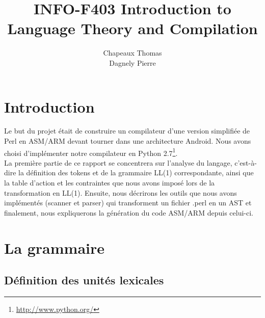 \documentclass[a4paper,10pt]{article}
\title{INFO-F403 Introduction to Language Theory and Compilation}
\author{Chapeaux Thomas\\Dagnely Pierre}
\begin{document}
\maketitle


\pagebreak


\renewcommand{\contentsname}{Table des matières}
\tableofcontents

\section{Introduction}

Le but du projet était de construire un compilateur d'une version simplifiée de Perl en ASM/ARM devant tourner dans une architecture Android. Nous avons choisi d'implémenter notre compilateur en Python 2.7\footnote{\url{http://www.python.org/}}.\\

La première partie de ce rapport se concentrera sur l'analyse du langage, c'est-à-dire la définition des tokens et de la grammaire LL(1) correspondante, ainsi que la table d'action et les contraintes que nous avons imposé lors de la transformation en LL(1). Ensuite, nous décrirons les outils que nous avons implémentés (scanner et parser) qui transforment un fichier .perl en un AST et finalement, nous expliquerons la génération du code ASM/ARM depuis celui-ci.



\section{La grammaire}

\subsection{Définition des unités lexicales}
\end{document}
